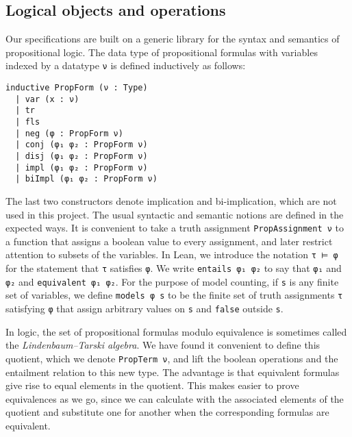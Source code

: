 \subsection{Logical objects and operations}

Our specifications are built on a generic library for the syntax and semantics of
propositional logic. The data type of propositional formulas with variables indexed by
a datatype \lstinline{ν} is defined inductively as follows:
\begin{lstlisting}
inductive PropForm (ν : Type)
  | var (x : ν)
  | tr
  | fls
  | neg (φ : PropForm ν)
  | conj (φ₁ φ₂ : PropForm ν)
  | disj (φ₁ φ₂ : PropForm ν)
  | impl (φ₁ φ₂ : PropForm ν)
  | biImpl (φ₁ φ₂ : PropForm ν)
\end{lstlisting}
The last two constructors denote implication and bi-implication, which are not used in this
project. The usual syntactic and semantic notions are defined in the expected ways.
It is convenient to take a truth assignment \lstinline{PropAssignment ν} to a function that
assigns a boolean value to every assignment, and later restrict attention to subsets of the
variables. In Lean, we introduce the notation \lstinline{τ ⊨ φ} for the statement that
\lstinline{τ} satisfies \lstinline{φ}. We write \lstinline{entails φ₁ φ₂} to say that
\lstinline{φ₁} and \lstinline{φ₂} and \lstinline{equivalent φ₁ φ₂}.
For the purpose of model counting, if \lstinline{s} is any finite set of variables,
we define \lstinline{models φ s} to be the finite set of truth assignments \lstinline{τ}
satisfying \lstinline{φ} that assign arbitrary values on \lstinline{s} and
\lstinline{false} outside \lstinline{s}.

In logic, the set of propositional formulas modulo equivalence is sometimes called the
\emph{Lindenbaum--Tarski algebra}. We have found it convenient to define this quotient,
which we denote \lstinline{PropTerm ν}, and lift the boolean operations and the entailment
relation to this new type. The advantage is that equivalent formulas give
rise to equal elements in the quotient.
This makes easier to prove equivalences as we go, since we can calculate with the associated
elements of the quotient and substitute one for another when the corresponding formulas are equivalent.

